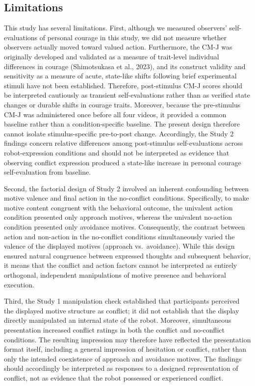 \subsection{Limitations}\label{limitations}

This study has several limitations. First, although we measured
observers' self-evaluations of personal courage in this study, we did
not measure whether observers actually moved toward valued action.
Furthermore, the CM-J was originally developed and validated as a
measure of trait-level individual differences in courage (Shimotsukasa
et al., 2023), and its construct validity and sensitivity as a measure
of acute, state-like shifts following brief experimental stimuli have
not been established. Therefore, post-stimulus CM-J scores should be
interpreted cautiously as transient self-evaluations rather than as
verified state changes or durable shifts in courage traits. Moreover,
because the pre-stimulus CM-J was administered once before all four
videos, it provided a common baseline rather than a condition-specific
baseline. The present design therefore cannot isolate stimulus-specific
pre-to-post change. Accordingly, the Study 2 findings concern relative
differences among post-stimulus self-evaluations across robot-expression
conditions and should not be interpreted as evidence that observing
conflict expression produced a state-like increase in personal courage
self-evaluation from baseline.

Second, the factorial design of Study 2 involved an inherent confounding
between motive valence and final action in the no-conflict conditions.
Specifically, to make motive content congruent with the behavioral
outcome, the univalent action condition presented only approach motives,
whereas the univalent no-action condition presented only avoidance
motives. Consequently, the contrast between action and non-action in the
no-conflict conditions simultaneously varied the valence of the
displayed motives (approach vs.~avoidance). While this design ensured
natural congruence between expressed thoughts and subsequent behavior,
it means that the conflict and action factors cannot be interpreted as
entirely orthogonal, independent manipulations of motive presence and
behavioral execution.

Third, the Study 1 manipulation check established that participants
perceived the displayed motive structure as conflict; it did not
establish that the display directly manipulated an internal state of the
robot. Moreover, simultaneous presentation increased conflict ratings in
both the conflict and no-conflict conditions. The resulting impression
may therefore have reflected the presentation format itself, including a
general impression of hesitation or conflict, rather than only the
intended coexistence of approach and avoidance motives. The findings
should accordingly be interpreted as responses to a designed
representation of conflict, not as evidence that the robot possessed or
experienced conflict.

